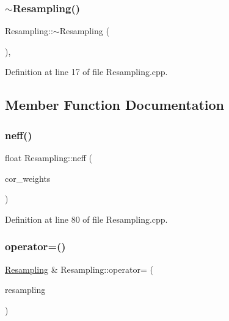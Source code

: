 \subsubsection{\texorpdfstring{$\sim$\+Resampling()}{~Resampling()}}
{\footnotesize\ttfamily Resampling\+::$\sim$\+Resampling (\begin{DoxyParamCaption}{ }\end{DoxyParamCaption})\hspace{0.3cm}{\ttfamily [virtual]}, {\ttfamily [noexcept]}}



Definition at line 17 of file Resampling.\+cpp.



\subsection{Member Function Documentation}
\mbox{\label{classbfl_1_1Resampling_aacbdbcf3f6c8620785ed6446928cd1f1}} 
\subsubsection{\texorpdfstring{neff()}{neff()}}
{\footnotesize\ttfamily float Resampling\+::neff (\begin{DoxyParamCaption}\item[{const Eigen\+::\+Ref$<$ const Eigen\+::\+Vector\+Xf $>$ \&}]{cor\+\_\+weights }\end{DoxyParamCaption})\hspace{0.3cm}{\ttfamily [virtual]}}



Definition at line 80 of file Resampling.\+cpp.

\mbox{\label{classbfl_1_1Resampling_a139238a96264afe71858445d8f2c137a}} 
\subsubsection{\texorpdfstring{operator=()}{operator=()}\hspace{0.1cm}{\footnotesize\ttfamily [1/3]}}
{\footnotesize\ttfamily \mbox{\hyperlink{classbfl_1_1Resampling}{Resampling}} \& Resampling\+::operator= (\begin{DoxyParamCaption}\item[{const \mbox{\hyperlink{classbfl_1_1Resampling}{Resampling}} \&}]{resampling }\end{DoxyParamCaption})}



